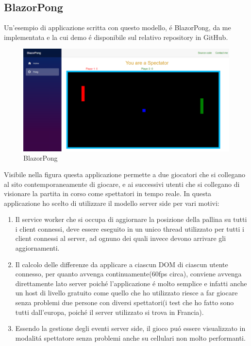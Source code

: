 \subsection{BlazorPong }\label{sez:bpong}
Un'esempio di applicazione scritta con questo modello, \'e BlazorPong, da me implementata e la cui demo \'e disponibile sul relativo repository in GitHub\cite{blazorPong}.

\begin{figure}[H]
	\centerline{\includegraphics[scale=0.3]{figure/BlazorPong.PNG}}
	\caption{BlazorPong}
	\label{fig:BlazorPong}
\end{figure}

Visibile nella figura  questa applicazione permette a due giocatori che si collegano al sito contemporaneamente di giocare, e ai successivi utenti che si collegano di visionare la partita in corso come spettatori in tempo reale.
In questa applicazione ho scelto di utilizzare il modello server side per vari motivi:
\begin{enumerate}
	\item Il service worker che si occupa di aggiornare la posizione della pallina su tutti i client connessi, deve essere eseguito in un unico thread utilizzato per tutti i client connessi al server, ad ognuno dei quali invece devono arrivare gli aggiornamenti.
	\item Il calcolo delle differenze da applicare a ciascun DOM di ciascun utente connesso, per quanto avvenga continuamente(60fps circa), conviene avvenga direttamente lato server poich\'e l'applicazione \'e molto semplice e infatti anche un host di livello gratuito come quello che ho utilizzato riesce a far giocare senza problemi due persone con diversi spettatori(i test che ho fatto sono tutti dall'europa, poich\'e il server utilizzato si trova in Francia).
	\item Essendo la gestione degli eventi server side, il gioco pu\'o essere visualizzato in modalit\'a spettatore senza problemi anche su cellulari non molto performanti.
	
\end{enumerate}

